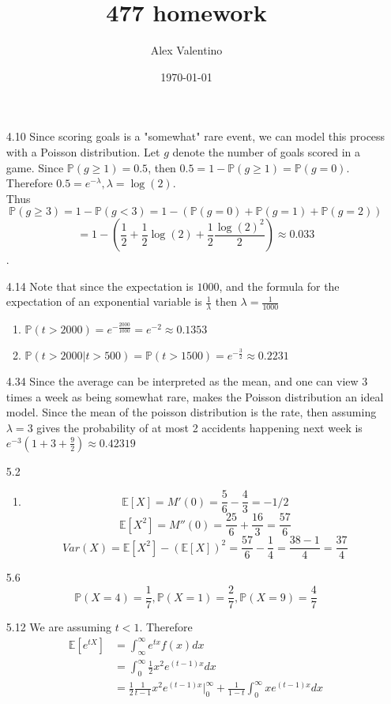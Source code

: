 \documentclass[12pt, letterpaper]{article}
\date{\today}
\author{Alex Valentino}
\title{477 homework}
\newcommand{\E}{\mathbb{E}}
\newcommand{\Pro}{\mathbb{P}}
\begin{document}
\begin{enumerate}
	\item[4.10] Since scoring goals is a "somewhat" rare event, we can 
	model this process with a Poisson distribution.  Let $g$ denote 
	the number of goals scored in a game.  Since $\Pro(g\geq 1) = 0.5$, then 
	$0.5=1-\Pro(g\geq 1) = \Pro(g = 0)$.  Therefore $0.5 = e^{-\lambda},\lambda = \log(2).$\\  Thus $$\Pro(g \geq 3) = 1 - \Pro(g < 3) = 1 - (\Pro(g=0)  + \Pro(g=1)+\Pro(g=2))$$ $$=  1 - (\frac{1}{2} + \frac{1}{2}\log(2) + \frac{1}{2}\frac{\log(2)^2}{2}) \approx 0.033$$.  
	\item[4.14] Note that since the expectation is $1000$, and the formula
	for the expectation of an exponential variable is $\frac{1}{\lambda}$ then $\lambda = \frac{1}{1000}$
	\begin{enumerate}
		\item $\Pro(t > 2000) = e^{-\frac{2000}{1000}} = e^{-2} \approx 0.1353 $
		\item $\Pro(t > 2000 | t > 500) = \Pro(t >1500) = e^{-\frac{3}{2}} \approx 0.2231$
	\end{enumerate}
	\item[4.34] Since the average can be interpreted as the mean, and 
	one can view 3 times a week as being somewhat rare, makes the Poisson distribution an ideal model.  Since the mean of the poisson distribution is the rate, then assuming $\lambda = 3$ gives the probability of at most 2 
	accidents happening next week is $e^{-3} (1 + 3 + \frac{9}{2} ) \approx 0.42319$
	\item[5.2]
	\begin{enumerate}
		\item 
		$$
			\E[X] = M'(0) = \frac{5}{6} - \frac{4}{3} = -1/2
		$$
		$$
			\E[X^2] = M''(0) = \frac{25}{6} + \frac{16}{3} = \frac{57}{6}
		$$
		$$
			Var(X) = \E[X^2] - (\E[X])^2  = \frac{57}{6} - \frac{1}{4} = \frac{38-1}{4} = \frac{37}{4}
		$$
	\end{enumerate}
	\item[5.6]
	$$
	\Pro(X=4) = \frac{1}{7},\Pro(X=1) = \frac{2}{7},\Pro(X=9) = \frac{4}{7}
	$$
	\item[5.12] We are assuming $t < 1$.  Therefore
	\begin{align*}
		\E[e^{tX}] &= \int_\infty^\infty e^{tx} f(x)dx\\
		&= \int_0^\infty \frac{1}{2} x^2 e^{(t-1)x}dx\\
		&= \frac{1}{2}\frac{1}{t-1}x^2 e^{(t-1)x}\bigg\rvert_{0}^\infty + \frac{1}{1-t}\int_0^\infty xe^{(t-1)x}dx\\

\end{align*}
\end{enumerate}
\end{document}
